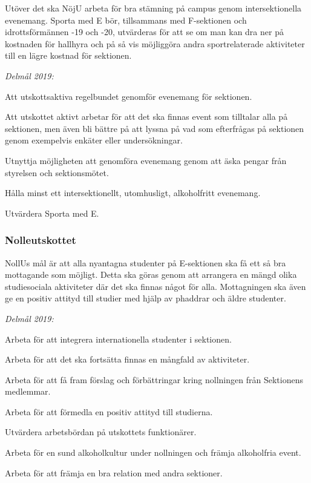 \documentclass[../_main/handlingar.tex]{subfiles}
\begin{document}
Utöver det ska NöjU arbeta för bra stämning på campus genom intersektionella evenemang. Sporta med E bör, tillsammans med F-sektionen och idrottsförmännen -19 och -20, utvärderas för att se om man kan dra ner på kostnaden för hallhyra och på så vis möjliggöra andra sportrelaterade aktiviteter till en lägre kostnad för sektionen.  


\emph{Delmål 2019:}
\begin{dashlist}
	\item Att utskottsaktiva regelbundet genomför evenemang för sektionen.
	\item Att utskottet aktivt arbetar för att det ska finnas event som tilltalar alla på sektionen, men även bli bättre på att lyssna på vad som efterfrågas på sektionen genom exempelvis enkäter eller undersökningar.
	\item Utnyttja möjligheten att genomföra evenemang genom att äska pengar från styrelsen och sektionsmötet.
	\item Hålla minst ett intersektionellt, utomhusligt, alkoholfritt evenemang.
	\item Utvärdera Sporta med E.
\end{dashlist}

\subsubsection*{Nolleutskottet}
NollUs mål är att alla nyantagna studenter på E-sektionen ska få ett så bra mottagande som möjligt. Detta ska göras genom att arrangera en mängd olika studiesociala aktiviteter där det ska finnas något för alla. Mottagningen ska även ge en positiv attityd till studier med hjälp av phaddrar och äldre studenter. 

\emph{Delmål 2019:}
\begin{dashlist}
	\item Arbeta för att integrera internationella studenter i sektionen. 
	\item Arbeta för att det ska fortsätta finnas en mångfald av aktiviteter.
	\item Arbeta för att få fram förslag och förbättringar kring nollningen från Sektionens medlemmar.
	\item Arbeta för att förmedla en positiv attityd till studierna.
	\item Utvärdera arbetsbördan på utskottets funktionärer.
	\item Arbeta för en sund alkoholkultur under nollningen och främja alkoholfria event.
	\item Arbeta för att främja en bra relation med andra sektioner.
\end{dashlist}
\end{document}
